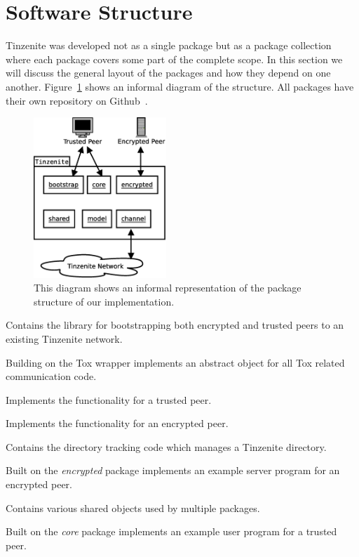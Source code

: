 \section{Software Structure}
\label{sec:Software Structure}

Tinzenite was developed not as a single package but as a package collection where each package covers some part of the complete scope.
In this section we will discuss the general layout of the packages and how they depend on one another.
Figure~\ref{fig:implementation_structure} shows an informal diagram of the structure.
All packages have their own repository on Github~\cite{web:site:github:tinzenite}.
\newpage

\begin{figure}[htp]
\centering
    \includegraphics[width=5cm]{diagram/topo_implementation}
\caption[Tinzenite Structure]{This diagram shows an informal representation of the package structure of our implementation.}
\label{fig:implementation_structure}
\end{figure}

\begin{description}[leftmargin=6em,style=nextline,noitemsep,nolistsep]
    \item[bootstrap]
        Contains the library for bootstrapping both encrypted and trusted peers to an existing Tinzenite network.
    \item[channel]
        Building on the Tox wrapper implements an abstract object for all Tox related communication code.
    \item[core]
        Implements the functionality for a trusted peer.
    \item[encrypted]
        Implements the functionality for an encrypted peer.
    \item[model]
        Contains the directory tracking code which manages a Tinzenite directory.
    \item[server]
        Built on the \emph{encrypted} package implements an example server program for an encrypted peer.
    \item[shared]
        Contains various shared objects used by multiple packages.
    \item[tin]
        Built on the \emph{core} package implements an example user program for a trusted peer.
\end{description}

